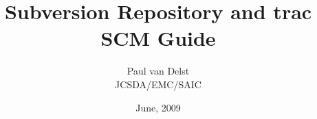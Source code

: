 



\newcommand{\f}[1]{\texttt{#1}}
\newcommand{\subversion}{\href{http://subversion.tigris.org/}{subversion}}
\newcommand{\trac}{\href{http://trac.edgewall.org/}{\textsf{trac}}}

\title{Subversion Repository and trac SCM Guide}
\author{Paul van Delst\\JCSDA/EMC/SAIC}
\date{June, 2009}



\maketitle


\setcounter{page}{1}
  \tableofcontents\newpage
  \listoffigures\newpage
  \listoftables\newpage
{}
\setcounter{page}{1}






\clearpage



\begin{appendix}
\end{appendix}



